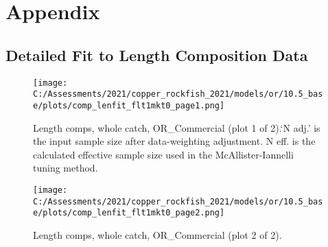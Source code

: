 \documentclass[11pt,
  english,
  a4paper,
]{article}
\begin{document}
\tagmcend\tagstructend

\clearpage


\hypertarget{appendix}{%
\section{Appendix}\label{appendix}}

\leavevmode\tagmcend\tagstructend


\hypertarget{detailed-fit-to-length-composition-data}{%
\subsection{Detailed Fit to Length Composition Data}\label{detailed-fit-to-length-composition-data}}

\leavevmode\tagmcend\tagstructend


\begin{figure}
\centering
\texttt{[image: C:/Assessments/2021/copper\_rockfish\_2021/models/or/10.5\_base/plots/comp\_lenfit\_flt1mkt0\_page1.png]}
\caption{Length comps, whole catch, OR\_Commercial (plot 1 of 2).`N adj.' is the input sample size after data-weighting adjustment. N eff. is the calculated effective sample size used in the McAllister-Iannelli tuning method.\label{fig:comp_lenfit_flt1mkt0_page1}}
\end{figure}

\tagmcend\tagstructend


\begin{figure}
\centering
\texttt{[image: C:/Assessments/2021/copper\_rockfish\_2021/models/or/10.5\_base/plots/comp\_lenfit\_flt1mkt0\_page2.png]}
\caption{Length comps, whole catch, OR\_Commercial (plot 2 of 2).\label{fig:comp_lenfit_flt1mkt0_page2}}
\end{figure}
\end{document}

